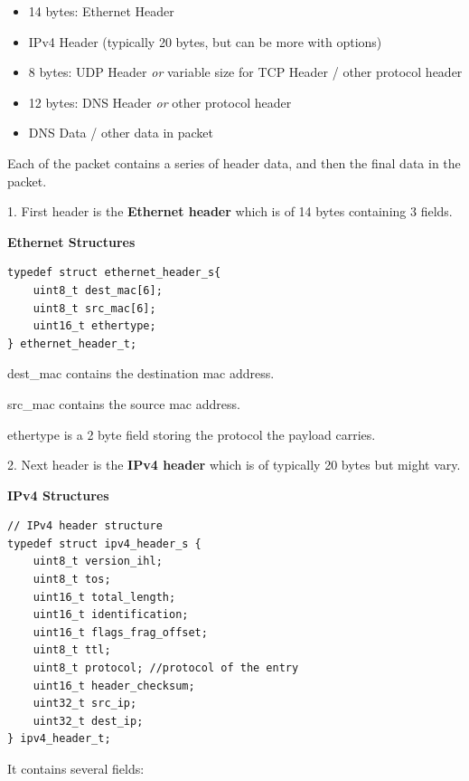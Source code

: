 \documentclass[12pt, a4paper]{report}
\begin{document}
    \begin{itemize}
        \item 14 bytes: Ethernet Header
        \item IPv4 Header (typically 20 bytes, but can be more with options)
        \item 8 bytes: UDP Header \textit{or} variable size for TCP Header / other protocol header
        \item 12 bytes: DNS Header \textit{or} other protocol header
        \item DNS Data / other data in packet
    \end{itemize}


Each of the packet contains a series of header data, and then the final data in the packet.

1. First header is the \textbf{Ethernet header} which is of 14 bytes containing 3 fields.

\textbf{Ethernet Structures}

\begin{lstlisting}[caption={Ethernet Header Structure}]
typedef struct ethernet_header_s{
    uint8_t dest_mac[6];
    uint8_t src_mac[6];
    uint16_t ethertype;
} ethernet_header_t;
\end{lstlisting}

dest\_mac contains the destination mac address.

src\_mac contains the source mac address.

ethertype is a 2 byte field storing the protocol the payload carries.

2. Next header is the \textbf{IPv4 header} which is of typically 20 bytes but might vary.

\textbf{IPv4 Structures}

\begin{lstlisting}[caption={IPv4 Header Structure}]
// IPv4 header structure
typedef struct ipv4_header_s {
    uint8_t version_ihl;
    uint8_t tos;
    uint16_t total_length;
    uint16_t identification;
    uint16_t flags_frag_offset;
    uint8_t ttl;
    uint8_t protocol; //protocol of the entry
    uint16_t header_checksum;
    uint32_t src_ip;
    uint32_t dest_ip;
} ipv4_header_t;
\end{lstlisting}

It contains several fields:
\end{document}
